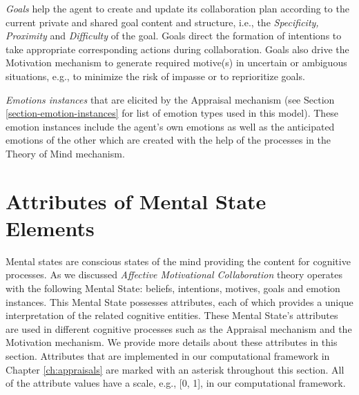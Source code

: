 \documentclass[12pt]{report}
\begin{document}
\textit{Goals} help the agent to create and update its collaboration plan
according to the current private and shared goal content and structure, i.e.,
the \textit{Specificity, Proximity} and \textit{Difficulty} of the goal. Goals
direct the formation of intentions to take appropriate corresponding actions
during collaboration. Goals also drive the Motivation mechanism to generate
required motive(s) in uncertain or ambiguous situations, e.g., to minimize the
risk of impasse or to reprioritize goals. 


\textit{Emotions instances}  that are elicited by the Appraisal mechanism (see
Section \ref{section-emotion-instances} for list of emotion types used in this
model). These emotion instances include the agent's own emotions as well as
the anticipated emotions of the other which are created with the help of the
processes in the Theory of Mind mechanism.

\section{Attributes of Mental State Elements}
\label{sec:mental-states-attributes}

Mental states are conscious states of the mind providing the content for
cognitive processes. As we discussed \textit{Affective Motivational
Collaboration} theory operates with the following Mental State: beliefs,
intentions, motives, goals and emotion instances. This Mental State possesses
attributes, each of which provides a unique interpretation of the related
cognitive entities. These Mental State's attributes are used in different
cognitive processes such as the Appraisal mechanism and the Motivation
mechanism. We provide more details about these attributes in this section.
Attributes that are implemented in our computational framework in Chapter
\ref{ch:appraisals} are marked with an asterisk throughout this section.
All of the attribute values have a scale, e.g., [0, 1], in our
computational framework.
\end{document}
